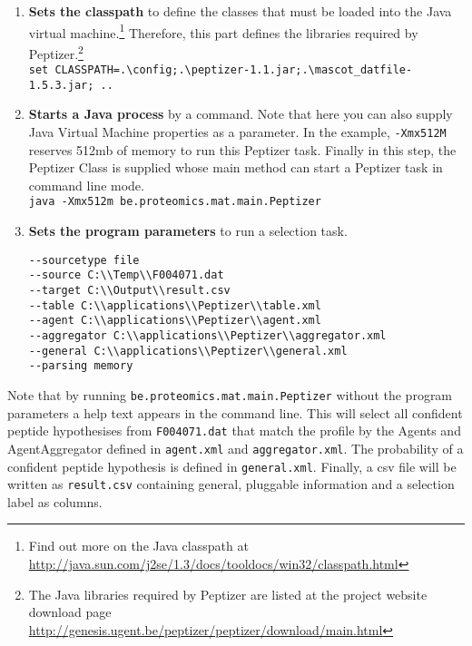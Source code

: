 \begin{enumerate}
\item \textbf{Sets the classpath} to define the classes that must be loaded into the Java virtual machine.\footnote{Find out more on the Java classpath at \url{http://java.sun.com/j2se/1.3/docs/tooldocs/win32/classpath.html}} Therefore, this part defines the libraries required by Peptizer.\footnote{The Java libraries required by Peptizer are listed at the project website download page \url{http://genesis.ugent.be/peptizer/peptizer/download/main.html}}\\\verb!set CLASSPATH=.\config;.\peptizer-1.1.jar;.\mascot_datfile-1.5.3.jar; ..!
\item \textbf{Starts a Java process} by a command. Note that here you can also supply Java Virtual Machine properties as a parameter. In the example, \verb!-Xmx512M! reserves 512mb of memory to run this Peptizer task. Finally in this step, the Peptizer Class is supplied whose main method can start a Peptizer task in command line mode.
\\\texttt{java -Xmx512m be.proteomics.mat.main.Peptizer}
\\
\item \textbf{Sets the program parameters} to run a selection task.
\begin{verbatim}
--sourcetype file
--source C:\\Temp\\F004071.dat
--target C:\\Output\\result.csv
--table C:\\applications\\Peptizer\\table.xml
--agent C:\\applications\\Peptizer\\agent.xml
--aggregator C:\\applications\\Peptizer\\aggregator.xml
--general C:\\applications\\Peptizer\\general.xml
--parsing memory

\end{verbatim}
\end{enumerate}
\npar Note that by running \texttt{be.proteomics.mat.main.Peptizer} without the program parameters a help text appears in the command line.
\npar This will select all confident peptide hypothesises from \verb!F004071.dat! that match the profile by the Agents and AgentAggregator defined in \verb!agent.xml! and \verb!aggregator.xml!. The probability of a confident peptide hypothesis is defined in \verb!general.xml!. Finally, a csv file will be written as \verb!result.csv! containing general, pluggable information and a selection label as columns.
